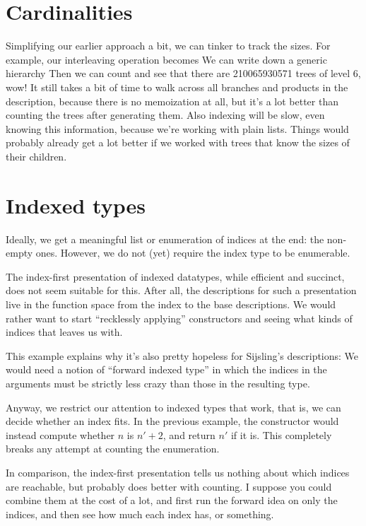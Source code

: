 \section{Cardinalities}
Simplifying our earlier approach a bit, we can tinker 
to track the sizes. For example, our interleaving operation becomes
We can write down a generic hierarchy
Then we can count 
and see that there are 210065930571 trees of level 6, wow! It still takes a bit of time to walk across all branches and products in the description, because there is no memoization at all, but it's a lot better than counting the trees after generating them. Also indexing will be slow, even knowing this information, because we're working with plain lists. Things would probably already get a lot better if we worked with trees that know the sizes of their children.

\section{Indexed types}
Ideally, we get a meaningful list or enumeration of indices at the end: the non-empty ones. However, we do not (yet) require the index type to be enumerable.

The index-first presentation of indexed datatypes, while efficient and succinct, does not seem suitable for this. After all, the descriptions for such a presentation live in the function space from the index to the base descriptions. We would rather want to start ``recklessly applying'' constructors and seeing what kinds of indices that leaves us with.

This example explains why it's also pretty hopeless for Sijsling's descriptions:
We would need a notion of ``forward indexed type'' in which the indices in the arguments must be strictly less crazy than those in the resulting type.

Anyway, we restrict our attention to indexed types that work, that is, we can decide whether an index fits. In the previous example, the constructor would instead compute whether $n$ is $n' + 2$, and return $n'$ if it is. This completely breaks any attempt at counting the enumeration.

In comparison, the index-first presentation tells us nothing about which indices are reachable, but probably does better with counting. I suppose you could combine them at the cost of a lot, and first run the forward idea on only the indices, and then see how much each index has, or something.